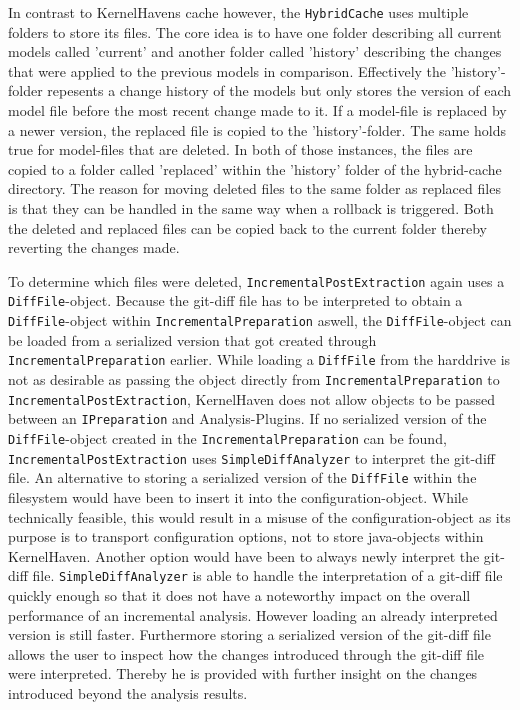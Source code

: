 \documentclass[a4paper]{article}
\begin{document}
 In contrast to KernelHavens cache however, the \texttt{Hybrid\-Cache} uses multiple folders to store its files. The core idea is to have one folder describing all current models called 'current' and another folder called 'history' describing the changes that were applied to the previous models in comparison. Effectively the 'history'-folder repesents a change history of the models but only stores the version of each model file before the most recent change made to it. 
 If a model-file is replaced by a newer version, the replaced file is copied to the 'history'-folder. The same holds true for model-files that are deleted. In both of those instances, the files are copied to a folder called 'replaced' within the 'history' folder of the hybrid-cache directory. The reason for moving deleted files to the same folder as replaced files is that they can be handled in the same way when a rollback is triggered. Both the deleted and replaced files can be copied back to the current folder thereby reverting the changes made.
 
To determine which files were deleted, \texttt{Incremental\-Post\-Extraction} again uses a \texttt{DiffFile}-object. Because the git-diff file has to be interpreted to obtain a \texttt{DiffFile}-object within \texttt{Incremental\-Preparation} aswell, the \texttt{DiffFile}-object can be loaded from a serialized version that got created through \texttt{Incremental\-Preparation} earlier. While loading a \texttt{DiffFile} from the harddrive is not as desirable as passing the object directly from \texttt{Incremental\-Preparation} to \texttt{Incremental\-Post\-Extraction}, KernelHaven does not allow objects to be passed between an \texttt{IPreparation} and Analysis-Plugins. If no serialized version of the \texttt{DiffFile}-object created in the \texttt{Incremental\-Preparation} can be found, \texttt{Incremental\-Post\-Extraction} uses \texttt{Simple\-Diff\-Analyzer} to interpret the git-diff file. An alternative to storing a serialized version of the \texttt{DiffFile} within the filesystem would have been to insert it into the configuration-object. While technically feasible, this would result in a misuse of the configuration-object as its purpose is to transport configuration options, not to store java-objects within KernelHaven. Another option would have been to always newly interpret the git-diff file. \texttt{Simple\-Diff\-Analyzer} is able to handle the interpretation of a git-diff file quickly enough so that it does not have a noteworthy impact on the overall performance of an incremental analysis. However loading an already interpreted version is still faster. Furthermore storing a serialized version of the git-diff file allows the user to inspect how the changes introduced through the git-diff file were interpreted. Thereby he is provided with further insight on the changes introduced beyond the analysis results.
 
\end{document}
